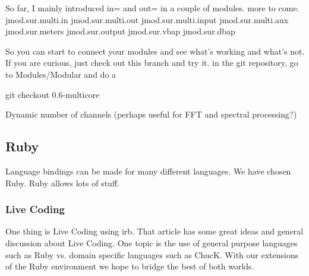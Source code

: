 \documentclass[twoside,a4paper]{article}
\begin{document}
So far, I mainly introduced in= and out= in a couple of modules. more to come.
jmod.sur.multi.in
jmod.sur.multi.out
jmod.sur.multi.input
jmod.sur.multi.aux
jmod.sur.meters
jmod.sur.output
jmod.sur.vbap
jmod.sur.dbap


So you can start to connect your modules and see what's working and 
what's not.
If you are curious, just check out this branch and try it.
in the git repository, go to Modules/Modular and do a

git checkout 0.6-multicore


Dynamic number of channels (perhaps useful for FFT and spectral processing?)





\subsection{Ruby} %

Language bindings can be made for many different languages.  We have chosen Ruby.  Ruby allows lots of stuff.  

\subsubsection{Live Coding} %

One thing is Live Coding \cite{Collins:2003} using irb.  That article has some great ideas and general discussion about Live Coding.  One topic is the use of general purpose languages such as Ruby vs. domain specific languages such as ChucK.  With our extensions of the Ruby environment we hope to bridge the best of both worlds.
\end{document}
